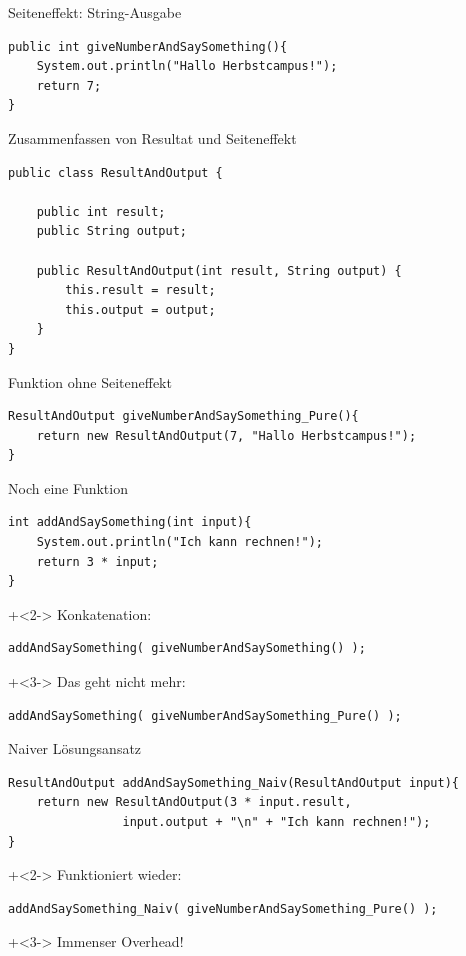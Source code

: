 \begin{frame}[fragile]{Seiteneffekt: String-Ausgabe}
\begin{lstlisting}
public int giveNumberAndSaySomething(){
    System.out.println("Hallo Herbstcampus!");
    return 7;
}
\end{lstlisting}
\end{frame}

\begin{frame}[fragile]{Zusammenfassen von Resultat und Seiteneffekt}
\begin{lstlisting}
public class ResultAndOutput {

    public int result;
    public String output;
	
    public ResultAndOutput(int result, String output) {
        this.result = result;
        this.output = output;
    }
}
\end{lstlisting}
\end{frame}

\begin{frame}[fragile]{Funktion ohne Seiteneffekt}
\begin{lstlisting}
ResultAndOutput giveNumberAndSaySomething_Pure(){
    return new ResultAndOutput(7, "Hallo Herbstcampus!");
}
\end{lstlisting}
\end{frame}

\begin{frame}[fragile]{Noch eine Funktion}
\begin{lstlisting}
int addAndSaySomething(int input){
    System.out.println("Ich kann rechnen!");
    return 3 * input;
}
\end{lstlisting}
\onslide+<2->
Konkatenation:
\begin{lstlisting}
addAndSaySomething( giveNumberAndSaySomething() );
\end{lstlisting}	

\onslide+<3->
Das geht nicht mehr:
\begin{lstlisting}
addAndSaySomething( giveNumberAndSaySomething_Pure() );
\end{lstlisting}	
\end{frame}


\begin{frame}[fragile]{Naiver Lösungsansatz}
\begin{lstlisting}
ResultAndOutput addAndSaySomething_Naiv(ResultAndOutput input){
    return new ResultAndOutput(3 * input.result, 
                input.output + "\n" + "Ich kann rechnen!");
}
\end{lstlisting}

\onslide+<2->
Funktioniert wieder:
\begin{lstlisting}
addAndSaySomething_Naiv( giveNumberAndSaySomething_Pure() );
\end{lstlisting}

\onslide+<3->
Immenser Overhead!
\end{frame}


